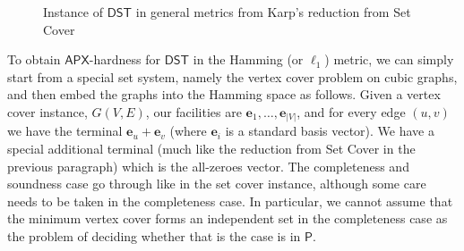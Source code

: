 \documentclass{article}\providecommand{\DeclareRedundantLanguages}[2]{}\usepackage[a4paper,margin=20mm]{geometry}
\newcommand{\1}{\textbf{1}}
\newcommand{\dst}{$\mathsf{DST}$\xspace}
\newcommand{\apx}{$\mathsf{APX}$\xspace}
\begin{document}
\begin{figure}[h]






    \caption{Instance of \dst in general metrics from Karp's reduction from Set Cover}
    \label{fig: karp reduction}
\end{figure}

To obtain \apx-hardness for \dst in the Hamming (or $\ell_1$) metric, we can simply start from a special set system, namely the vertex cover problem on cubic graphs, and then embed the graphs into the Hamming space as follows. Given a vertex cover instance, $G(V,E)$, our facilities are $\mathbf{e}_1,\ldots, \mathbf{e}_{|V|}$, and for every edge $(u,v)$ we have the terminal $\mathbf{e}_u+\mathbf{e}_v$ (where $\mathbf{e}_i$ is a standard basis vector). We have a special additional terminal (much like the reduction from Set Cover in the previous paragraph) which is the all-zeroes vector. The completeness and soundness case go through like in the set cover instance, although some care needs to be taken in the completeness case. In particular, we cannot assume that the minimum vertex cover forms an independent set in the completeness case as the problem of deciding whether that is the case is in $\textsf{P}$.
\end{document}
